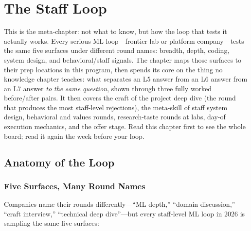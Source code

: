 \chapter{The Staff Loop}
\label{chap:staff_loop}

\begin{tldr}
This is the meta-chapter: not what to know, but how the loop that tests it actually works. Every serious ML loop---frontier lab or platform company---tests the same five surfaces under different round names: breadth, depth, coding, system design, and behavioral/staff signals. The chapter maps those surfaces to their prep locations in this program, then spends its core on the thing no knowledge chapter teaches: what separates an L5 answer from an L6 answer from an L7 answer \textit{to the same question}, shown through three fully worked before/after pairs. It then covers the craft of the project deep dive (the round that produces the most staff-level rejections), the meta-skill of staff system design, behavioral and values rounds, research-taste rounds at labs, day-of execution mechanics, and the offer stage. Read this chapter first to see the whole board; read it again the week before your loop.
\end{tldr}

\section{Anatomy of the Loop}
\label{sec:loop_anatomy}

\subsection{Five Surfaces, Many Round Names}

Companies name their rounds differently---``ML depth,'' ``domain discussion,'' ``craft interview,'' ``technical deep dive''---but every staff-level ML loop in 2026 is sampling the same five surfaces:

